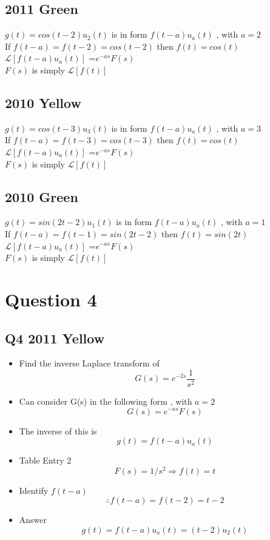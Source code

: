 \documentclass[11pt,a4paper,titlepage,oneside,openany]{article}
\numberwithin{equation}{section}
\numberwithin{algorithm}{section}
\numberwithin{figure}{section}
\numberwithin{table}{section}
\begin{document}
\subsection*{2011 Green}
$g(t) = cos(t-2)u_2(t)$ is in form $f(t-a)u_a(t)$ , with $a=2$ \\
If $f(t-a) = f(t-2) = cos(t-2)$ then $f(t)= cos(t)$ \\
$\mathcal{L}[f(t-a)u_a(t)]$ =$e^{-as}F(s)$ \\
$F(s)$ is simply $\mathcal{L}[f(t)]$\\
\subsection*{2010 Yellow}
$g(t) = cos(t-3)u_3(t)$ is in form $f(t-a)u_a(t)$ , with $a=3$ \\
If $f(t-a) = f(t-3) = cos(t-3)$ then $f(t)= cos(t)$ \\
$\mathcal{L}[f(t-a)u_a(t)]$ =$e^{-as}F(s)$ \\
$F(s)$ is simply $\mathcal{L}[f(t)]$\\
\subsection*{2010 Green}
$g(t) = sin(2t - 2)u_1(t)$ is in form $f(t-a)u_a(t)$ , with $a=1$ \\
If $f(t-a) = f(t-1) = sin(2t - 2)$ then $f(t)= sin(2t)$ \\
$\mathcal{L}[f(t-a)u_a(t)]$ =$e^{-as}F(s)$ \\
$F(s)$ is simply $\mathcal{L}[f(t)]$\\
\newpage
\section{Question 4}
\subsection*{Q4 2011 Yellow}

\begin{itemize}
\item Find the inverse Laplace transform of
\[ G(s) = e^{-2s}\frac{1}{s^2} \]
\item Can consider G(s) in the following form , with $a=2$
\[ G(s) = e^{-as}F(s) \]
\item The inverse of this is
\[ g(t) = f(t-a) u_a(t) \]
\item Table Entry 2
\[ F(s) = 1/s^2 \Rightarrow f(t) = t \]
\item Identify $f(t-a)$
\[ \therefore f(t-a) = f(t-2) = t-2 \]
\item Answer
\[ g(t) = f(t-a)u_a(t) = (t-2)u_2(t) \]
\end{itemize}
\end{document}
